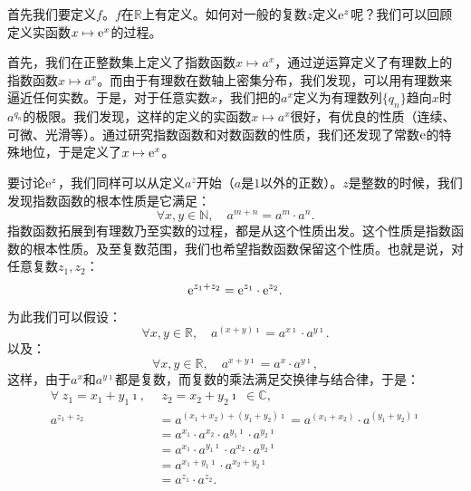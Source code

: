 \documentclass[12pt,UTF8]{ctexbook}
\begin{document}
\begin{so}
    首先我们要定义$f$。$f$在$\mathbb{R}$上有定义。如何对一般的复数$z$定义$\mathrm{e}^z$呢？我们可以回顾定义实函数$x\mapsto \mathrm{e}^x$的过程。
    
    首先，我们在正整数集上定义了指数函数$x\mapsto a^x$，通过逆运算定义了有理数上的指数函数$x\mapsto a^x$。而由于有理数在数轴上密集分布，我们发现，可以用有理数来逼近任何实数。于是，对于任意实数$x$，我们把的$a^x$定义为有理数列$\{q_n\}$趋向$x$时$a^{q_n}$的极限。我们发现，这样的定义的实函数$x\mapsto a^x$很好，有优良的性质（连续、可微、光滑等）。通过研究指数函数和对数函数的性质，我们还发现了常数$\mathrm{e}$的特殊地位，于是定义了$x\mapsto \mathrm{e}^x$。

    要讨论$\mathrm{e}^z$，我们同样可以从定义$a^z$开始（$a$是$1$以外的正数）。$z$是整数的时候，我们发现指数函数的根本性质是它满足：
    \begin{equation}
        \forall x, y \in \mathbb{N}, \quad a^{m + n} = a^m \cdot a^n. \label{4-6-0} 
    \end{equation}
    指数函数拓展到有理数乃至实数的过程，都是从这个性质出发。这个性质是指数函数的根本性质。及至复数范围，我们也希望指数函数保留这个性质。也就是说，对任意复数$z_1, z_2$：
    \begin{equation}
        \mathrm{e}^{z_1 + z_2} = \mathrm{e}^{z_1} \cdot \mathrm{e}^{z_2}. \label{4-6-1}
    \end{equation}
    为此我们可以假设：
    \begin{equation}
        \forall x, y \in \mathbb{R}, \quad a^{(x + y)\imath} = a^{x\imath} \cdot a^{y\imath}. \label{4-6-3}
    \end{equation}
    以及：
    \begin{equation}
        \forall x, y \in \mathbb{R}, \quad a^{x+y\imath} = a^x \cdot a^{y\imath},  \label{4-6-2}
    \end{equation}
    这样，由于$a^x$和$a^{y\imath}$都是复数，而复数的乘法满足交换律与结合律，于是：
    \begin{align*}
        \forall \; z_1 = x_1 + y_1\imath, \,&\; z_2 = x_2 + y_2\imath \; \in \mathbb{C}, \\
        a^{z_1 + z_2} &= a^{(x_1 + x_2) + (y_1 + y_2)\imath} = a^{(x_1 + x_2)} \cdot a^{(y_1 + y_2)\imath} \\
        &= a^{x_1} \cdot a^{x_2} \cdot a^{y_1\imath} \cdot a^{y_2\imath} \\
        &= a^{x_1} \cdot a^{y_1\imath} \cdot a^{x_2} \cdot a^{y_2\imath} \\
        &= a^{x_1 + y_1\imath} \cdot a^{x_2 + y_2\imath} \\
        &= a^{z_1} \cdot a^{z_2}.
    \end{align*}


\end{so}
\end{document}
